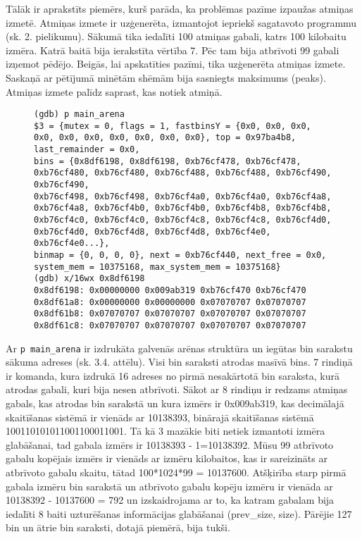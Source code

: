 Tālāk ir aprakstīts piemērs, kurš parāda, ka problēmas pazīme izpaužas atmiņas izmetē.
Atmiņas izmete ir uzģenerēta, izmantojot iepriekš sagatavoto programmu (sk. 2. pielikumu).
Sākumā tika iedalīti 100 atmiņas gabali, katrs 100 kilobaitu izmēra.
Katrā baitā bija ierakstīta vērtība 7.
Pēc tam bija atbrīvoti 99 gabali izņemot pēdējo.
Beigās, lai apskatīties pazīmi, tika uzģenerēta atmiņas izmete.
Saskaņā ar pētījumā minētām shēmām \cite{PWMS}  bija sasniegts maksimums (peaks).
Atmiņas izmete palīdz saprast, kas notiek atmiņā.
\begin{figure}[h]
\begin{lstlisting}[style=customgdb]
(gdb) p main_arena
$3 = {mutex = 0, flags = 1, fastbinsY = {0x0, 0x0, 0x0, 0x0, 0x0, 0x0, 0x0, 0x0, 0x0, 0x0}, top = 0x97ba4b8, last_remainder = 0x0,
bins = {0x8df6198, 0x8df6198, 0xb76cf478, 0xb76cf478, 0xb76cf480, 0xb76cf480, 0xb76cf488, 0xb76cf488, 0xb76cf490, 0xb76cf490,
0xb76cf498, 0xb76cf498, 0xb76cf4a0, 0xb76cf4a0, 0xb76cf4a8, 0xb76cf4a8, 0xb76cf4b0, 0xb76cf4b0, 0xb76cf4b8, 0xb76cf4b8,
0xb76cf4c0, 0xb76cf4c0, 0xb76cf4c8, 0xb76cf4c8, 0xb76cf4d0, 0xb76cf4d0, 0xb76cf4d8, 0xb76cf4d8, 0xb76cf4e0, 0xb76cf4e0...},
binmap = {0, 0, 0, 0}, next = 0xb76cf440, next_free = 0x0, system_mem = 10375168, max_system_mem = 10375168}
(gdb) x/16wx 0x8df6198
0x8df6198: 0x00000000 0x009ab319 0xb76cf470 0xb76cf470
0x8df61a8: 0x00000000 0x00000000 0x07070707 0x07070707
0x8df61b8: 0x07070707 0x07070707 0x07070707 0x07070707
0x8df61c8: 0x07070707 0x07070707 0x07070707 0x07070707
\end{lstlisting}
\caption{\textbf{\fontsize{11}{12}\selectfont {bin saraksta izdruka, izmantojot atmiņas izmeti}}}
\end{figure}
Ar \texttt{p main\_arena} ir izdrukāta galvenās arēnas struktūra un iegūtas bin sarakstu sākuma adreses (sk. 3.4. attēlu).
Visi bin saraksti atrodas masīvā bins.
7 rindiņā ir komanda, kura izdrukā 16 adreses no pirmā nesakārtotā bin saraksta, kurā atrodas gabali, kuri bija nesen atbrīvoti.
Sākot ar 8 rindiņu ir redzams atmiņas gabals, kas atrodas bin sarakstā un kura izmērs ir 0x009ab319, kas decimālajā skaitīšanas sistēmā ir vienāds ar 10138393, binārajā skaitīšanas sistēmā 100110101011001100011001.
Tā kā 3 mazākie biti netiek izmantoti izmēra glabāšanai, tad gabala izmērs ir 10138393 - 1=10138392.
Mūsu 99 atbrīvoto gabalu kopējais izmērs ir vienāds ar izmēru kilobaitos, kas ir sareizināts ar atbrīvoto gabalu skaitu, tātad 100*1024*99 = 10137600.
Atšķirība starp pirmā gabala izmēru bin sarakstā un atbrīvoto gabalu kopēju izmēru ir vienāda ar 10138392 - 10137600 = 792 un izskaidrojama ar to, ka katram gabalam bija iedalīti 8 baiti uzturēšanas informācijas glabāšanai (prev\_size, size).
Pārējie 127 bin un ātrie bin saraksti, dotajā piemērā, bija tukši.

